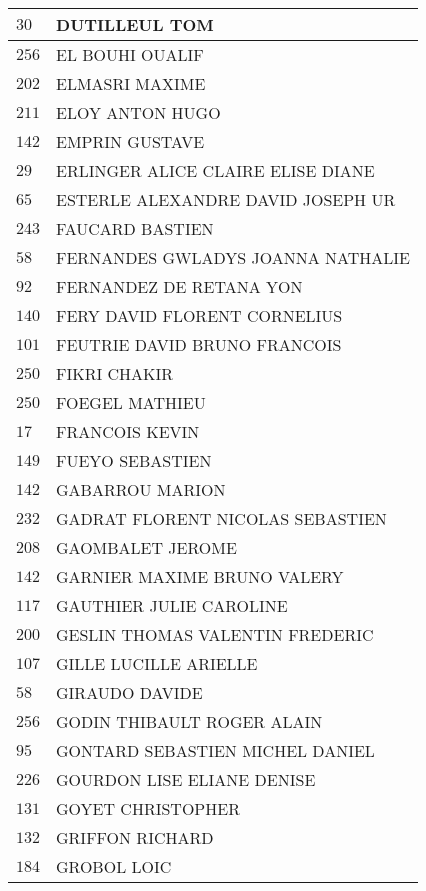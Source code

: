 \begin{xltabular}{\linewidth}{|l|X|}
    \hline
    $30$ & DUTILLEUL TOM \\
    \hline
    $256$ & EL BOUHI OUALIF \\
    \hline
    $202$ & ELMASRI MAXIME \\
    \hline
    $211$ & ELOY ANTON HUGO \\
    \hline
    $142$ & EMPRIN GUSTAVE \\
    \hline
    $29$ & ERLINGER ALICE CLAIRE ELISE DIANE \\
    \hline
    $65$ & ESTERLE ALEXANDRE DAVID JOSEPH UR \\
    \hline
    $243$ & FAUCARD BASTIEN \\
    \hline
    $58$ & FERNANDES GWLADYS JOANNA NATHALIE \\
    \hline
    $92$ & FERNANDEZ DE RETANA YON \\
    \hline
    $140$ & FERY DAVID FLORENT CORNELIUS \\
    \hline
    $101$ & FEUTRIE DAVID BRUNO FRANCOIS \\
    \hline
    $250$ & FIKRI CHAKIR \\
    \hline
    $250$ & FOEGEL MATHIEU \\
    \hline
    $17$ & FRANCOIS KEVIN \\
    \hline
    $149$ & FUEYO SEBASTIEN \\
    \hline
    $142$ & GABARROU MARION \\
    \hline
    $232$ & GADRAT FLORENT NICOLAS SEBASTIEN \\
    \hline
    $208$ & GAOMBALET JEROME \\
    \hline
    $142$ & GARNIER MAXIME BRUNO VALERY \\
    \hline
    $117$ & GAUTHIER JULIE CAROLINE \\
    \hline
    $200$ & GESLIN THOMAS VALENTIN FREDERIC \\
    \hline
    $107$ & GILLE LUCILLE ARIELLE \\
    \hline
    $58$ & GIRAUDO DAVIDE \\
    \hline
    $256$ & GODIN THIBAULT ROGER ALAIN \\
    \hline
    $95$ & GONTARD SEBASTIEN MICHEL DANIEL \\
    \hline
    $226$ & GOURDON LISE ELIANE DENISE \\
    \hline
    $131$ & GOYET CHRISTOPHER \\
    \hline
    $132$ & GRIFFON RICHARD \\
    \hline
    $184$ & GROBOL LOIC \\

\end{xltabular}
